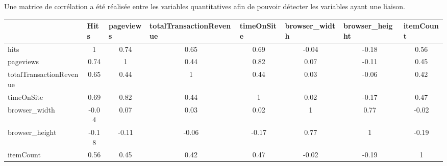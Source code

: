 Une matrice de corrélation a été réalisée entre les variables quantitatives afin de pouvoir détecter les variables ayant une liaison.

\begin{table}[ht]
\begin{adjustbox}{width=1\textwidth}
\small
\begin{tabular}{|l|c|c|c|c|c|c|c|}
\hline
                        & \multicolumn{1}{l|}{Hits} & \multicolumn{1}{l|}{pageviews} & \multicolumn{1}{l|}{totalTransactionRevenue} & \multicolumn{1}{l|}{timeOnSite} & \multicolumn{1}{l|}{browser\_width} & \multicolumn{1}{l|}{browser\_height} & \multicolumn{1}{l|}{itemCount} \\ \hline
hits                    & 1                         & \cellcolor{green!15} 0.74                           & 0.65                                         & 0.69                            & -0.04                               & -0.18                                & 0.56                           \\ \hline
pageviews               & \cellcolor{green!15}0.74                      & 1                              & 0.44                                         & \cellcolor{green!15}0.82                            & 0.07                                & -0.11                                & 0.45                           \\ \hline
totalTransactionRevenue & 0.65                      & 0.44                           & 1                                            & 0.44                            & 0.03                                & -0.06                                & 0.42                           \\ \hline
timeOnSite              & 0.69                      &\cellcolor{green!15} 0.82                           & 0.44                                         & 1                               & 0.02                                & -0.17                                & 0.47                           \\ \hline
browser\_width          & -0.04                     & 0.07                           & 0.03                                         & 0.02                            & 1                                   & \cellcolor{green!15}0.77                                 & -0.02                          \\ \hline
browser\_height         & -0.18                     & -0.11                          & -0.06                                        & -0.17                           &\cellcolor{green!15} 0.77                                & 1                                    & -0.19                          \\ \hline
itemCount               & 0.56                      & 0.45                           & 0.42                                         & 0.47                            & -0.02                               & -0.19                                & 1                              \\ \hline
\end{tabular}
\end{adjustbox}
\end{table}
 
